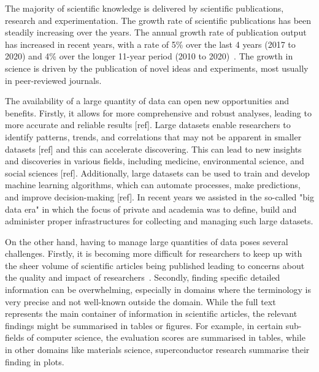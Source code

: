 
The majority of scientific knowledge is delivered by scientific publications, research and experimentation. 
The growth rate of scientific publications has been steadily increasing over the years. 
The annual growth rate of publication output has increased in recent years, with a rate of 5\% over the last 4 years (2017 to 2020) and 4\% over the longer 11-year period (2010 to 2020)~\cite{publication_output_us}.
The growth in science is driven by the publication of novel ideas and experiments, most usually in peer-reviewed journals. 


The availability of a large quantity of data can open new opportunities and benefits. 
Firstly, it allows for more comprehensive and robust analyses, leading to more accurate and reliable results [ref]. 
Large datasets enable researchers to identify patterns, trends, and correlations that may not be apparent in smaller datasets [ref] and this can accelerate discovering.
This can lead to new insights and discoveries in various fields, including medicine, environmental science, and social sciences [ref]. Additionally, large datasets can be used to train and develop machine learning algorithms, which can automate processes, make predictions, and improve decision-making [ref].
In recent years we assisted in the so-called "big data era" in which the focus of private and academia was to define, build and administer proper infrastructures for collecting and managing such large datasets. 



On the other hand, having to manage large quantities of data poses several challenges. 
Firstly, it is becoming more difficult for researchers to keep up with the sheer volume of scientific articles being published leading to concerns about the quality and impact of researchers~\cite{rawat2014publish}.  
Secondly, finding specific detailed information can be overwhelming, especially in domains where the terminology is very precise and not well-known outside the domain.
While the full text represents the main container of information in scientific articles, the relevant findings might be summarised in tables or figures. 
For example, in certain sub-fields of computer science, the evaluation scores are summarised in tables, while in other domains like materials science, superconductor research summarise their finding in plots. 

